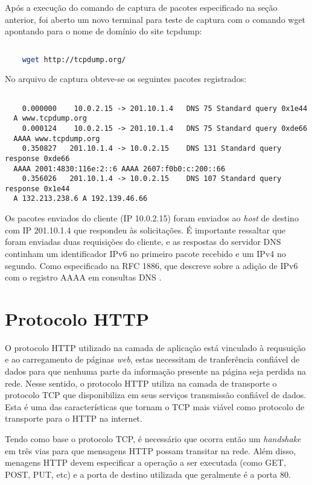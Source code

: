 \documentclass[a4paper]{report} %
\begin{document}
Após a execução do comando de captura de pacotes especificado na seção anterior, foi aberto um novo terminal para teste de captura com o comando wget apontando para o nome de domínio do site tcpdump:
\begin{lstlisting}[language=bash]

	wget http://tcpdump.org/

\end{lstlisting}

	No arquivo de captura obteve-se os seguintes pacotes registrados:

\begin{lstlisting}

	0.000000    10.0.2.15 -> 201.10.1.4   DNS 75 Standard query 0x1e44
  A www.tcpdump.org
	0.000124    10.0.2.15 -> 201.10.1.4   DNS 75 Standard query 0xde66
  AAAA www.tcpdump.org
	0.350827   201.10.1.4 -> 10.0.2.15    DNS 131 Standard query response 0xde66
  AAAA 2001:4830:116e:2::6 AAAA 2607:f0b0:c:200::66
	0.356026   201.10.1.4 -> 10.0.2.15    DNS 107 Standard query response 0x1e44
  A 132.213.238.6 A 192.139.46.66

\end{lstlisting}

	Os pacotes enviados do cliente (IP 10.0.2.15) foram enviados ao \textit{host} de destino com IP 201.10.1.4 que respondeu às solicitações. É importante ressaltar que foram enviadas duas requisições do cliente, e as respostas do servidor DNS continham um identificador IPv6 no primeiro pacote recebido e um IPv4 no segundo. Como especificado na RFC 1886, que descreve sobre a adição de IPv6 com o registro AAAA em consultas DNS \cite{IETF}.

\section{Protocolo HTTP}
\label{sec_http}
O protocolo HTTP utilizado na camada de aplicação está vinculado à requsuição e ao carregamento de páginas \textit{web}, estas necessitam de tranferência confiável de dados para que nenhuma parte da informação presente na página seja perdida na rede. Nesse sentido, o protocolo HTTP utiliza na camada de transporte o protocolo TCP que disponibiliza em seus serviços transmissão confiável de dados. Esta é uma das características que tornam o TCP mais viável como protocolo de transporte para o HTTP na internet.

	Tendo como base o protocolo TCP, é necessário que ocorra então um \textit{handshake} em três vias para que mensagens HTTP possam transitar na rede. Além disso, menagens HTTP devem especificar a operação a ser executada (como GET, POST, PUT, etc) e a porta de destino utilizada que geralmente é a porta 80.
\end{document}
